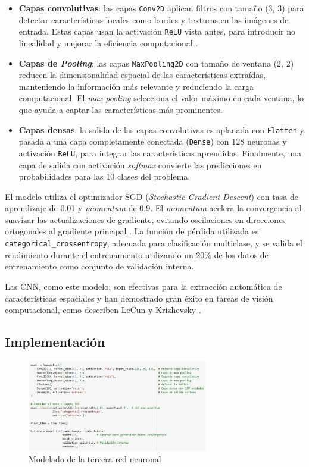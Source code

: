 \begin{itemize}
	\item \textbf{Capas convolutivas}: las capas \texttt{Conv2D} aplican filtros con tamaño (3, 3) para detectar características locales como bordes y texturas en las imágenes de entrada. Estas capas usan la activación \texttt{ReLU} vista antes, para introducir no linealidad y mejorar la eficiencia computacional \parencite{nair2010relu}.
	\item \textbf{Capas de \textit{Pooling}}: las capas \texttt{MaxPooling2D} con tamaño de ventana (2, 2) reducen la dimensionalidad espacial de las características extraídas, manteniendo la información más relevante y reduciendo la carga computacional. El \textit{max-pooling} selecciona el valor máximo en cada ventana, lo que ayuda a captar las características más prominentes.
	\item \textbf{Capas densas}: la salida de las capas convolutivas es aplanada con \texttt{Flatten} y pasada a una capa completamente conectada (\texttt{Dense}) con 128 neuronas y activación \texttt{ReLU}, para integrar las características aprendidas. Finalmente, una capa de salida con activación \textit{softmax} convierte las predicciones en probabilidades para las 10 clases del problema.
\end{itemize}

El modelo utiliza el optimizador SGD (\textit{Stochastic Gradient Descent}) con tasa de aprendizaje de 0.01 y \textit{momentum} de 0.9. El \textit{momentum} acelera la convergencia al suavizar las actualizaciones de gradiente, evitando oscilaciones en direcciones ortogonales al gradiente principal \parencite{sutskever2013momentum}. La función de pérdida utilizada es \texttt{categorical\_crossentropy}, adecuada para clasificación multiclase, y se valida el rendimiento durante el entrenamiento utilizando un 20\% de los datos de entrenamiento como conjunto de validación interna.

Las CNN, como este modelo, son efectivas para la extracción automática de características espaciales y han demostrado gran éxito en tareas de visión computacional, como describen LeCun \parencite{lecun1998gradient} y Krizhevsky \parencite{krizhevsky2012imagenet}.

\subsection{Implementación}

\begin{figure}[H]
	\centering
	\includegraphics[width=0.7\textwidth]{imgs/model-red3.JPG}
	\caption{Modelado de la tercera red neuronal}
	\label{fig:model-red3}
\end{figure}

